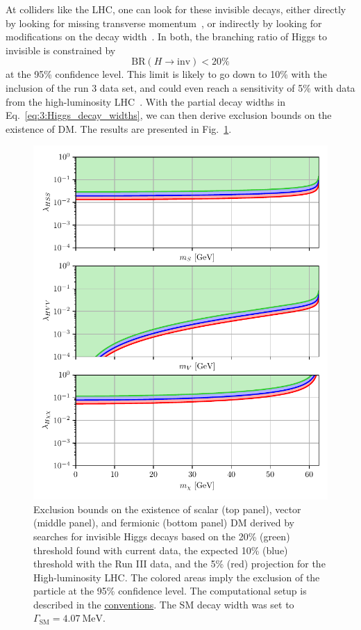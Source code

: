 At colliders like the \acs{LHC}, one can look for these invisible decays, either directly by looking for missing transverse momentum~\cite{ATLAS:2017nyv,CMS:2016dhk}, or indirectly by looking for modifications on the decay width~\cite{ATLAS:2016neq, ATLAS:2014hzd}. In both, the branching ratio of Higgs to invisible is constrained by
\begin{equation}
\mathrm{BR}(H \rightarrow \mathrm{inv}) < 20\%
\end{equation}
at the 95\% confidence level. This limit is likely to go down to 10\% with the inclusion of the run 3 data set, and could even reach a sensitivity of 5\% with data from the high-luminosity \acs{LHC}~\cite{Liss:2013hbb, CMS:2013xfa, Cepeda:2019klc}. With the partial decay widths in Eq.~\eqref{eq:3:Higgs_decay_widths}, we can then derive exclusion bounds on the existence of \acs{DM}. The results are presented in Fig.~\ref{fig:3:Higgs_portal_exclusion_bounds}.
\begin{figure}[h]
\centering
\includegraphics[width=\figurewidth]{Images/Higgs_portal_exclusion_bounds.pdf}
\caption{Exclusion bounds on the existence of scalar (top panel), vector (middle panel), and fermionic (bottom panel) \acs{DM} derived by searches for invisible Higgs decays based on the 20\% (green) threshold found with current data, the expected 10\% (blue) threshold with the Run III data, and the 5\% (red) projection for the High-luminosity \acs{LHC}. The colored areas imply the exclusion of the particle at the 95\% confidence level. The computational setup is described in the \hyperref[chap:notation_and_conventions]{conventions}. The \acs{SM} decay width was set to $\Gamma_{\text{SM}} = 4.07\ \text{MeV}$.}
\label{fig:3:Higgs_portal_exclusion_bounds}
\end{figure}


